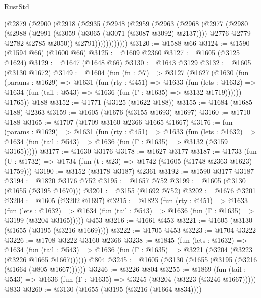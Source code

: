 \begin{lexlean}{RustStd}
\begin{coremodule}
          (@2879
            (@2900
              (@2918
                (@2935
                  (@2948
                    (@2959
                      (@2963
                        (@2968
                          (@2977
                            (@2980
                              (@2988
                                (@2991 (@3059 (@3065 (@3071 (@3087 @3092) @2137))))
                                @2776
                                @2779
                                @2782
                                @2785
                                @2050))
                            @2791))))))))))))
@3120 := @1588 @66
@3124 := @1590 (@1594 @66) (@1600 @66)
@3125 := @1609 @2360
@3127 := @1605 (@3125 @1624)
@3129 := @1647 (@1648 @66)
@3130 := @1643 @3129
@3132 := @1605 (@3130 @1672)
@3149 := @1604
    (fun (fn : @7) =>
    @3127
      (@1627
        (@1630
          (fun (params : @1629) =>
          @1631
            (fun (rty : @451) =>
            @1633
              (fun (lets : @1632) =>
              @1634 (fun (tail : @543) => @1636 (fun (Γ : @1635) => @3132 @1719))))))
        @1765))
    @188
@3152 := @1771 (@3125 (@1622 @188))
@3155 := @1684 (@1685 @188) @2363
@3159 := @1605 (@1676 (@3155 @1693) @1697)
@3160 := @1710 @188
@3165 := @1707 (@1709 @3160 @2366 @1665 @1667)
@3176 := fun (params : @1629) =>
  @1631
    (fun (rty : @451) =>
    @1633
      (fun (lets : @1632) =>
      @1634 (fun (tail : @543) => @1636 (fun (Γ : @1635) => @3132 (@3159 @3165)))))
@3177 := @1630 @3176
@3178 := @1627 @3177
@3187 := @1733 (fun (U : @1732) => @1734 (fun (t : @23) => @1742 (@1605 (@1748 @2363 @1623) @1759)))
@3190 := @3152 (@3178 @3187) @2361
@3192 := @1590 @3177 @3187
@3194 := @1820 @3176 @752
@3195 := @1657 @752
@3199 := @1605 (@3130 (@1655 (@3195 @1670)))
@3201 := @3155 (@1692 @752)
@3202 := @1676 @3201
@3204 := @1605 (@3202 @1697)
@3215 := @1823
    (fun (rty : @451) =>
    @1633
      (fun (lets : @1632) =>
      @1634 (fun (tail : @543) => @1636 (fun (Γ : @1635) => @3199 (@3204 @3165)))))
    @453
@3216 := @1661 @453
@3221 := @1605 (@3130 (@1655 (@3195 (@3216 @1669))))
@3222 := @1705 @453
@3223 := @1704 @3222
@3226 := @1708 @3222 @3160 @2366
@3238 := @1845
    (fun (lets : @1632) =>
    @1634
      (fun (tail : @543) => @1636 (fun (Γ : @1635) => @3221 (@3204 (@3223 (@3226 @1665 @1667))))))
    @804
@3245 := @1605 (@3130 (@1655 (@3195 (@3216 (@1664 (@805 @1667))))))
@3246 := @3226 @804
@3255 := @1869
    (fun (tail : @543) => @1636 (fun (Γ : @1635) => @3245 (@3204 (@3223 (@3246 @1667)))))
    @833
@3260 := @3130 (@1655 (@3195 (@3216 (@1664 @834))))

\end{coremodule}
\end{lexlean}
